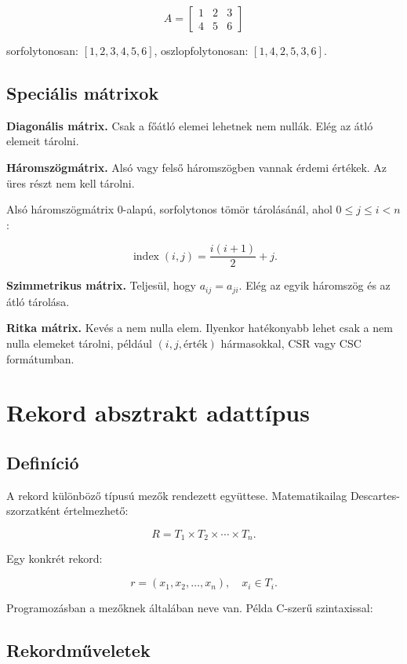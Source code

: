 \[
A=\begin{bmatrix}
1&2&3\\
4&5&6
\end{bmatrix}
\]

sorfolytonosan: $[1,2,3,4,5,6]$, oszlopfolytonosan: $[1,4,2,5,3,6]$.

\subsection{Speciális mátrixok}

\textbf{Diagonális mátrix.} Csak a főátló elemei lehetnek nem nullák. Elég az átló elemeit tárolni.

\textbf{Háromszögmátrix.} Alsó vagy felső háromszögben vannak érdemi értékek. Az üres részt nem kell tárolni.

Alsó háromszögmátrix 0-alapú, sorfolytonos tömör tárolásánál, ahol $0\leq j\leq i<n$:

\[
\operatorname{index}(i,j)=\frac{i(i+1)}{2}+j.
\]

\textbf{Szimmetrikus mátrix.} Teljesül, hogy $a_{ij}=a_{ji}$. Elég az egyik háromszög és az átló tárolása.

\textbf{Ritka mátrix.} Kevés a nem nulla elem. Ilyenkor hatékonyabb lehet csak a nem nulla elemeket tárolni, például $(i,j,\text{érték})$ hármasokkal, CSR vagy CSC formátumban.

\section{Rekord absztrakt adattípus}

\subsection{Definíció}

A rekord különböző típusú mezők rendezett együttese. Matematikailag Descartes-szorzatként értelmezhető:

\[
R=T_1\times T_2\times\cdots\times T_n.
\]

Egy konkrét rekord:

\[
r=(x_1,x_2,\ldots,x_n),\quad x_i\in T_i.
\]

Programozásban a mezőknek általában neve van. Példa C-szerű szintaxissal:


\subsection{Rekordműveletek}

